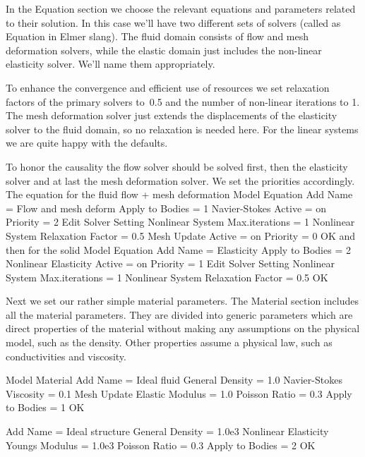 In the Equation section we choose the relevant equations and parameters related to their solution. 
In this case we'll have two different sets of solvers (called as Equation in Elmer slang). 
The fluid domain consists of flow and mesh deformation solvers, while the 
elastic domain just includes the non-linear elasticity solver. We'll name them appropriately. 

To enhance the convergence and efficient use of resources 
we set relaxation factors of the primary solvers to~0.5 and the 
number of non-linear iterations to 1. The mesh deformation solver just extends the 
displacements of the elasticity solver to the fluid domain, so no relaxation is needed here. 
For the linear systems we are quite happy with the defaults.

To honor the causality the flow solver should be solved first, then the elasticity solver and
at last the mesh deformation solver. We set the priorities accordingly. 
\\
\noindent
The equation for the fluid flow + mesh deformation
\ttbegin
Model
  Equation
    Add
    Name = Flow and mesh deform
    Apply to Bodies = 1
    Navier-Stokes
      Active = on
      Priority = 2 
      Edit Solver Setting
        Nonlinear System
          Max.iterations = 1
          Nonlinear System Relaxation Factor = 0.5
    Mesh Update
      Active = on
      Priority = 0 
    OK
\ttend        
and then for the solid
\ttbegin
Model
  Equation
    Add
    Name = Elasticity
    Apply to Bodies = 2
    Nonlinear Elasticity
      Active = on
      Priority = 1
      Edit Solver Setting
        Nonlinear System
          Max.iterations = 1
          Nonlinear System Relaxation Factor = 0.5
    OK
\ttend    

Next we set our rather simple material parameters.
The Material section includes all the material parameters.
They are divided into generic parameters which are direct properties of the material
without making any assumptions on the physical model, such as the density. Other properties assume
a physical law, such as conductivities and viscosity. 

\ttbegin
Model
  Material
    Add
    Name = Ideal fluid 
    General 
      Density = 1.0
    Navier-Stokes
      Viscosity = 0.1
    Mesh Update
      Elastic Modulus = 1.0
      Poisson Ratio = 0.3  
    Apply to Bodies = 1 
    OK

    Add  
    Name = Ideal structure
    General 
      Density = 1.0e3
    Nonlinear Elasticity
      Youngs Modulus = 1.0e3
      Poisson Ratio = 0.3
    Apply to Bodies = 2
    OK
\ttend

